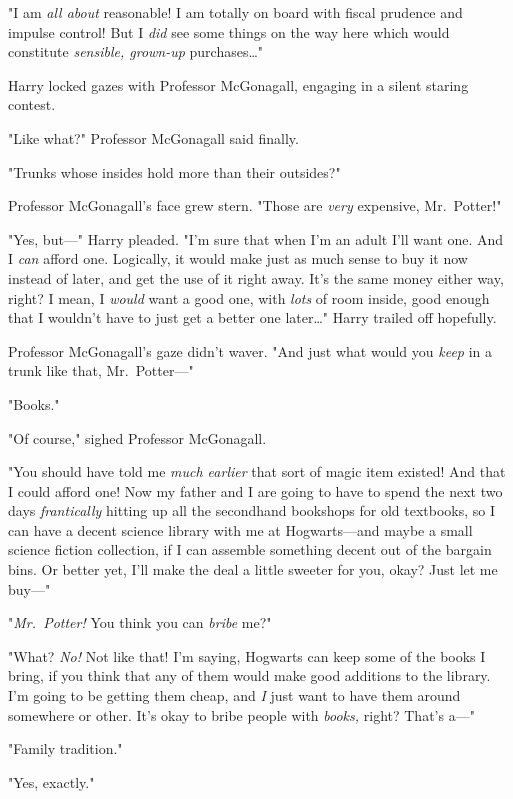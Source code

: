 "I am \emph{all about} reasonable! I am totally on board with fiscal prudence 
and impulse control! But I \emph{did} see some things on the way here which 
would constitute \emph{sensible, grown-up} purchases{\ldots}"

Harry locked gazes with Professor McGonagall, engaging in a silent staring 
contest.

"Like what?" Professor McGonagall said finally.

"Trunks whose insides hold more than their outsides?"

Professor McGonagall's face grew stern. "Those are \emph{very} expensive, 
Mr.~Potter!"

"Yes, but---" Harry pleaded. "I'm sure that when I'm an adult I'll want one. 
And I \emph{can} afford one. Logically, it would make just as much sense to buy 
it now instead of later, and get the use of it right away. It's the same money 
either way, right? I mean, I \emph{would} want a good one, with \emph{lots} of 
room inside, good enough that I wouldn't have to just get a better one 
later{\ldots}" Harry trailed off hopefully.

Professor McGonagall's gaze didn't waver. "And just what would you \emph{keep} 
in a trunk like that, Mr.~Potter---"

"Books."

"Of course," sighed Professor McGonagall.

"You should have told me \emph{much earlier} that sort of magic item existed! 
And that I could afford one! Now my father and I are going to have to spend the 
next two days \emph{frantically} hitting up all the secondhand bookshops for 
old textbooks, so I can have a decent science library with me at Hogwarts---and 
maybe a small science fiction collection, if I can assemble something decent 
out of the bargain bins. Or better yet, I'll make the deal a little sweeter for 
you, okay? Just let me buy---"

"\emph{Mr.~Potter!} You think you can \emph{bribe} me?"

"What? \emph{No!} Not like that! I'm saying, Hogwarts can keep some of the 
books I bring, if you think that any of them would make good additions to the 
library. I'm going to be getting them cheap, and \emph{I} just want to have 
them around somewhere or other. It's okay to bribe people with \emph{books,} 
right? That's a---"

"Family tradition."

"Yes, exactly."

